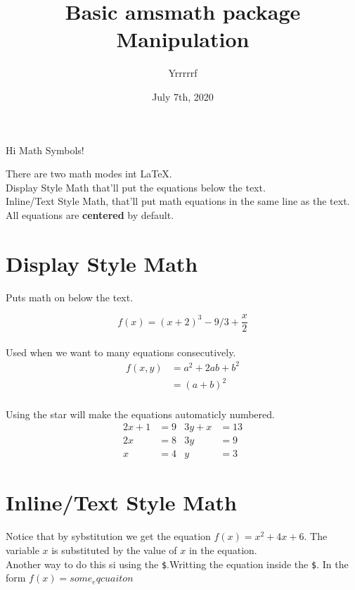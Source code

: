 \documentclass{article}
\title{Basic amsmath package Manipulation}
\author{Yrrrrrf}
\date{July 7th, 2020}
\begin{document}
    \maketitle

    \normalsize Hi Math Symbols! \\ \raggedright
    There are two math modes int \LaTeX. \\
    Display Style Math that'll put the equations below the text. \\
    Inline/Text Style Math, that'll put math equations in the same line as the text.
    \\[\baselineskip]
    All equations are \textbf{centered} by default.
    \\[2\baselineskip]

    \section{Display Style Math}
        Puts math on below the text.

        \[f(x) = (x+2)^3 - 9/3 + \frac{x}{2} \] \\

        Used when we want to many equations consecutively.
        \begin{align*}
            f(x,y) & = a^2 + 2ab + b^2 \\
                & = (a+b)^2 \\
        \end{align*}

        Using the star will make the equations automaticly numbered.
        \begin{align}
            2x+1 & = 9 & 3y+x & =13\\
            2x & =8 & 3y & =9 \\
            \nonumber %
            x & =4 & y & =3
        \end{align}


    \section{Inline/Text Style Math}
        Notice that by sybstitution we get the equation \(f(x) = x^2 + 4x + 6\).
        The variable \(x\) is substituted by the value of \(x\) in the equation. \\[\baselineskip]
        Another way to do this si using the \verb|$|.Writting the equation inside the \verb|$|.
        In the form $f(x) = some_eqcuaiton$
\end{document}
